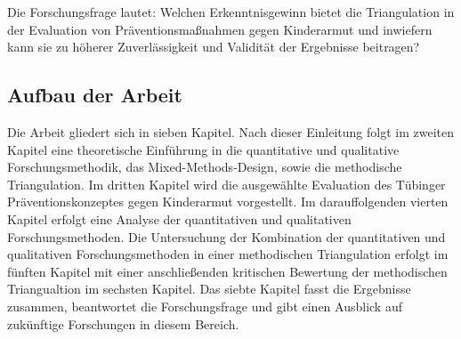 Die Forschungsfrage lautet: Welchen Erkenntnisgewinn bietet die Triangulation in der Evaluation von Präventionsmaßnahmen gegen Kinderarmut und inwiefern kann sie zu höherer Zuverlässigkeit und Validität der Ergebnisse beitragen?

\subsection{Aufbau der Arbeit}

Die Arbeit gliedert sich in sieben Kapitel. Nach dieser Einleitung folgt im zweiten Kapitel eine theoretische Einführung in die quantitative und qualitative Forschungsmethodik, das Mixed-Methods-Design, sowie die methodische Triangulation. Im dritten Kapitel wird die ausgewählte Evaluation des Tübinger Präventionskonzeptes gegen Kinderarmut vorgestellt. Im darauffolgenden vierten Kapitel erfolgt eine Analyse der quantitativen und qualitativen Forschungsmethoden. Die Untersuchung der Kombination der quantitativen und qualitativen Forschungsmethoden in einer methodischen Triangulation erfolgt im fünften Kapitel mit einer anschließenden kritischen Bewertung der methodischen Triangualtion im sechsten Kapitel. Das siebte Kapitel fasst die Ergebnisse zusammen, beantwortet die Forschungsfrage und gibt einen Ausblick auf zukünftige Forschungen in diesem Bereich.

